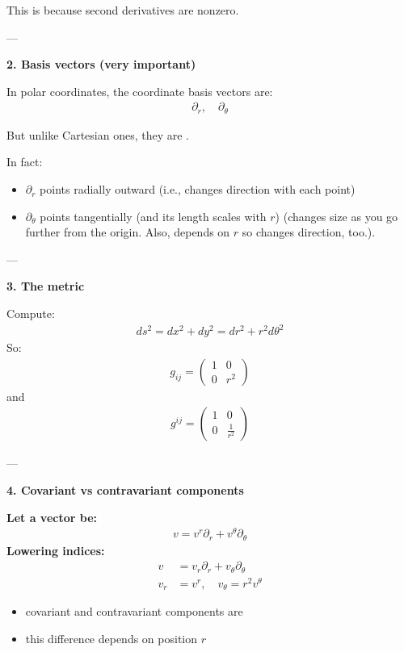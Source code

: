 \documentclass[12pt,a4paper]{report}
\begin{document}
\begin{description}
\begin{description}
This is  because second derivatives are nonzero.

---

\item \textbf{2. Basis vectors (very important)}

In polar coordinates, the coordinate basis vectors are:
\begin{align*}
\partial_r, \quad \partial_\theta
\end{align*}

But unlike Cartesian ones, they are .

In fact:
\begin{itemize}
\item $\partial_r$ points radially outward (i.e., changes direction with each point)
\item $\partial_\theta$ points tangentially (and its length scales with $r$) (changes size as you go further from the origin.  Also, depends on $r$ so changes direction, too.).
\end{itemize}

---

\item \textbf{3. The metric}

Compute:
\begin{align*}
ds^2 = dx^2 + dy^2 = dr^2 + r^2 d\theta^2
\end{align*} So:
\begin{align*}
g_{ij} =
\begin{pmatrix}
1 & 0 \\
0 & r^2
\end{pmatrix}
\end{align*} and
\begin{align*}
g^{ij} =
\begin{pmatrix}
1 & 0 \\
0 & \frac{1}{r^2}
\end{pmatrix}
\end{align*}

---

\item \textbf{4. Covariant vs contravariant components}

\textbf{Let a vector be:}
\begin{align*}
v = v^r \partial_r + v^\theta \partial_\theta
\end{align*}
\textbf{Lowering indices:}
\begin{align*}
v &= v_r \partial_r + v_\theta \partial_\theta \\
v_r &= v^r, \quad v_\theta = r^2 v^\theta 
\end{align*}
\begin{itemize}
\item covariant and contravariant components are 
\item this difference depends on position $r$
\end{itemize}


\end{description}
\end{description}
\end{document}
